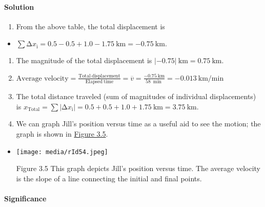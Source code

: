 \hypertarget{solution}{%
\paragraph{Solution}\label{solution}}

\begin{enumerate}
\def\labelenumi{\alph{enumi}.}
\item
  From the above table, the total displacement is
\end{enumerate}

\begin{itemize}
\item
  \(\sum\mathrm{\Delta}x_{\mathrm{i}} = 0.5 - 0.5 + 1.0 - 1.75\ \mathrm{\text{km}} = - 0.75\ \mathrm{\text{km}}\mathrm{.}\)
\end{itemize}

\begin{enumerate}
\def\labelenumi{\alph{enumi}.}
\setcounter{enumi}{1}
\item
  The magnitude of the total displacement is
  \(\left| - 0.75 \right|\ \mathrm{\text{km}} = 0.75\ \mathrm{\text{km}}\).
\item
  \(\mathrm{\text{Average\ velocity}} = \frac{\mathrm{\text{Total}}\ \mathrm{\text{displacement}}}{\mathrm{\text{Elapsed}}\ \mathrm{\text{time}}} = \overset{\mathrm{–}}{v} = \frac{- 0.75\ \mathrm{\text{km}}}{58\ \mathrm{\min}} = - 0.013\ \mathrm{km/min}\)
\item
  The total distance traveled (sum of magnitudes of individual
  displacements) is
  \(x_{\mathrm{\text{Total}}} = \sum\left| \mathrm{\Delta}x_{\mathrm{i}} \right| = 0.5 + 0.5 + 1.0 + 1.75\ \mathrm{\text{km}} = 3.75\ \mathrm{\text{km}}\).
\item
  We can graph Jill's position versus time as a useful aid to see the
  motion; the graph is shown in
  \protect\hyperlink{CNX_UPhysics_03_01_Pos}{Figure 3.5}.
\end{enumerate}

\begin{itemize}
\item
  \texttt{[image: media/rId54.jpeg]}

  Figure 3.5 This graph depicts Jill's position versus time. The average
  velocity is the slope of a line connecting the initial and final
  points.
\end{itemize}

\hypertarget{significance}{%
\paragraph{Significance}\label{significance}}

